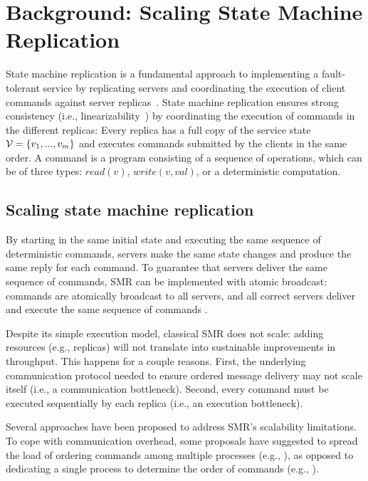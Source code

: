 \section{Background: Scaling State Machine Replication}


State machine replication is a fundamental approach to implementing a fault-tolerant service by replicating servers and coordinating the execution of client commands against server replicas~\cite{Lam78,Sch90}. 
State machine replication ensures strong consistency (i.e., linearizability~\cite{Attiya04}) by coordinating the execution of commands in the different replicas: Every replica has a full copy of the service state $\mathcal{V} = \{v_1, ..., v_m\}$ and executes commands submitted by the clients in the same order. A command is a program consisting of a sequence of operations, which can be of three types: $read(v)$, $write(v, val)$, or a deterministic computation.

\subsection{Scaling state machine replication}
By starting in the same initial state and executing the same sequence of deterministic commands, servers make the same state changes and produce the same reply for each command. To guarantee that servers deliver the same sequence of commands, SMR can be implemented with atomic broadcast: commands are atomically broadcast to all servers, and all correct servers deliver and execute the same sequence of commands \cite{BJ87b,DSU04}.

Despite its simple execution model, classical SMR does not scale: adding resources (e.g., replicas) will not translate into sustainable improvements in throughput. This happens for a couple reasons. First, the underlying communication protocol needed to ensure ordered message delivery may not scale itself (i.e., a communication bottleneck). Second, every command must be executed sequentially by each replica (i.e., an execution bottleneck).

Several approaches have been proposed to address SMR's scalability limitations. To cope with communication overhead, some proposals have suggested to spread the load of ordering commands among multiple processes (e.g., \cite{Moraru:2013gw,Mencius,Marandi:2012hb}), as opposed to dedicating a single process to determine the order of commands (e.g., \cite{Lamport:1998ea}).%

